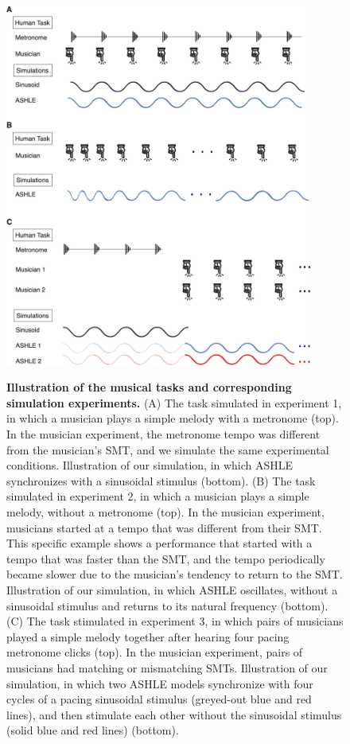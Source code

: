 \documentclass{report}
\begin{document}
\begin{figure}
    \centering
    \includegraphics[width=0.9\textwidth]{figures/fig3_1.png}
    \label{f3_1}
\end{figure}
\begin{figure}[t]
    \caption[Illustration of the musical tasks and corresponding simulation experiments]{\textbf{Illustration of the musical tasks and corresponding simulation experiments.} (A) The task simulated in experiment 1, in which a musician plays a simple melody with a metronome (top). In the musician experiment, the metronome tempo was different from the musician's SMT, and we simulate the same experimental conditions. Illustration of our simulation, in which ASHLE synchronizes with a sinusoidal stimulus (bottom). (B) The task simulated in experiment 2, in which a musician plays a simple melody, without a metronome (top). In the musician experiment, musicians started at a tempo that was different from their SMT. This specific example shows a performance that started with a tempo that was faster than the SMT, and the tempo periodically became slower due to the musician's tendency to return to the SMT. Illustration of our simulation, in which ASHLE oscillates, without a sinusoidal stimulus and returns to its natural frequency (bottom). (C) The task stimulated in experiment 3, in which pairs of musicians played a simple melody together after hearing four pacing metronome clicks (top). In the musician experiment, pairs of musicians had matching or mismatching SMTs. Illustration of our simulation, in which two ASHLE models synchronize with four cycles of a pacing sinusoidal stimulus (greyed-out blue and red lines), and then stimulate each other without the sinusoidal stimulus (solid blue and red lines) (bottom).} 
\end{figure}
\end{document}
